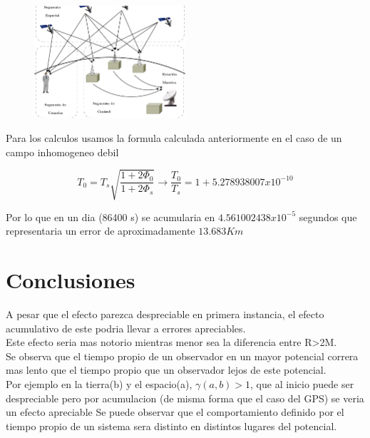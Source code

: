 \documentclass[12pt,twoside]{rif}
\begin{document}
	\begin{figure}[h]
	\centering
	\includegraphics[width=0.5\textwidth]{img/GPS.png}
	\label{fig:gps}
	\end{figure}
	
Para los calculos usamos la formula calculada anteriormente en el caso de un campo inhomogeneo debil

\begin{equation}
T_{0}=T_{s}\sqrt{\frac{1+2\Phi_{0}}{1+2\Phi_{s}}}\to
\frac{T_{0}}{T_{s}}=1+5.278938007 x 10^{-10}
\end{equation}

Por lo que en un dia (86400 s) se acumularia en $4.561002438x10^{-5}$ segundos que representaria un error de aproximadamente $13.683 Km$

	\section{Conclusiones}
A pesar que el efecto parezca despreciable en primera instancia, el efecto acumulativo de este podria llevar a errores apreciables.\\
Este efecto seria mas notorio mientras menor sea la diferencia entre R>2M.\\

Se observa que el tiempo propio de un observador en un mayor potencial correra mas lento que el tiempo propio que un observador lejos de este potencial.\\
Por ejemplo en la tierra(b) y el espacio(a), $\gamma(a,b)>1$, que al inicio puede ser despreciable pero por acumulacion (de misma forma que el caso del GPS) se veria un efecto apreciable
Se puede observar que el comportamiento definido por el tiempo propio de un sistema sera distinto en distintos lugares del potencial.
	\nocite{*}
	
	
	
\end{document}
